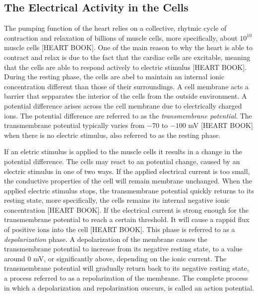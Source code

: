 \subsection{The Electrical Activity in the Cells}
The pumping function of the heart relies on a collective, rhytmic cycle of contraction and relaxation of billions of muscle cells, more specifically, about \(10^{10}\) muscle cells [HEART BOOK]. One of the main reason to why the heart is able to contract and relax is due to the fact that the cardiac cells are excitable, meaning that the cells are able to respond actively to electric stimulus [HEART BOOK]. During the resting phase, the cells are abel to maintain an internal ionic concentration different than those of their surroundings. A cell membrane acts a barrier that sepparates the interior of the cells from the outside environment. A potential difference arises across the cell membrane due to electrically charged ions. The potential difference are referred to as the \textit{transmembrane potential}. The transmembrane potential typically varies from \(-70\) to \(-100\) mV [HEART BOOK] when there is no electric stimulus, also referred to as the resting phase. 

If an eletric stimulus is applied to the muscle cells it results in a change in the potential difference. The cells may react to an potential change, caused by an electric stimulus in one of two ways. If the applied electrical current is too small, the conductive properties of the cell will remain membrane unchanged. When the applied electric stimulus stops, the transmembrane potential quickly returns to its resting state, more specifically, the cells remains its internal negative ionic concentration [HEART BOOK]. If the electrical current is strong enough for the transmembrane potential to reach a certain threshold. It will cause a rappid flux of positive ions into the cell [HEART BOOK]. This phase is referred to as a \textit{depolarization} phase. A depolarization of the membrane causes the transmembrane potential to increase from its negative resting state, to a value around \(0\) mV, or significantly above, depending on the ionic current. The transmembrane potential will gradually return back to its negative resting state, a process referred to as a repolarization of the membrane. The complete process in which a depolarization and repolarization ouccurs, is called an action potential. 

